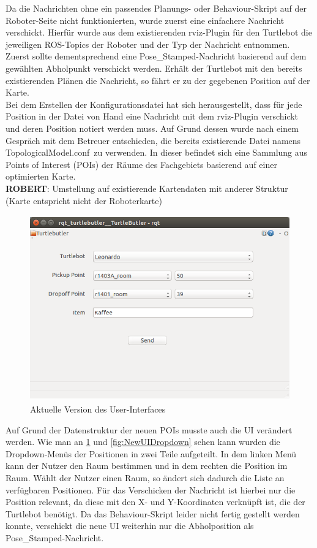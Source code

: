 \documentclass[a4paper,12pt,headsepline]{scrartcl}
\begin{document}
		Da die Nachrichten ohne ein passendes Planungs- oder Behaviour-Skript auf der Roboter-Seite nicht funktionierten, wurde zuerst eine einfachere Nachricht verschickt. Hierfür wurde aus dem existierenden rviz-Plugin für den Turtlebot die jeweiligen ROS-Topics der Roboter und der Typ der Nachricht entnommen. Zuerst sollte dementsprechend eine \glqq Pose{\_}Stamped\grqq-Nachricht basierend auf dem gewählten Abholpunkt verschickt werden. Erhält der Turtlebot mit den bereits existierenden Plänen die Nachricht, so fährt er zu der gegebenen Position auf der Karte.\\
		Bei dem Erstellen der Konfigurationsdatei hat sich herausgestellt, dass für jede Position in der Datei von Hand eine Nachricht mit dem rviz-Plugin verschickt und deren Position notiert werden muss. Auf Grund dessen wurde nach einem Gespräch mit dem Betreuer entschieden, die bereits existierende Datei namens \glqq TopologicalModel.conf\grqq\ zu verwenden. In dieser befindet sich eine Sammlung aus Points of Interest (POIs) der Räume des Fachgebiets basierend auf einer optimierten Karte.\\
		\textbf{ROBERT}: Umstellung auf existierende Kartendaten mit anderer Struktur (Karte entspricht nicht der Roboterkarte)
		\begin{figure} [H]
			\centering
			\includegraphics[height=8cm]{Images/Turtlebutler_Used.png}
			\caption{Aktuelle Version des User-Interfaces}
			\label{fig:NewUI}
		\end{figure}
		Auf Grund der Datenstruktur der neuen POIs musste auch die UI verändert werden. Wie man an \cref{fig:NewUI} und \cref{fig:NewUIDropdown} sehen kann wurden die Dropdown-Menüs der Positionen in zwei Teile aufgeteilt. In dem linken Menü kann der Nutzer den Raum bestimmen und in dem rechten die Position im Raum. Wählt der Nutzer einen Raum, so ändert sich dadurch die Liste an verfügbaren Positionen. Für das Verschicken der Nachricht ist hierbei nur die Position relevant, da diese mit den X- und Y-Koordinaten verknüpft ist, die der Turtlebot benötigt. Da das Behaviour-Skript leider nicht fertig gestellt werden konnte, verschickt die neue UI weiterhin nur die Abholposition als \glqq Pose{\_}Stamped\grqq-Nachricht.
\end{document}
